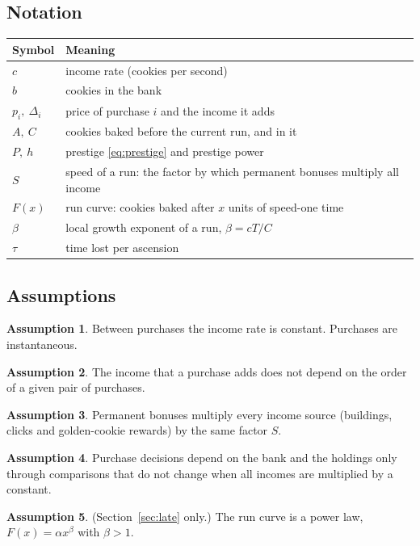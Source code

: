 \documentclass[11pt,a4paper]{article}
\numberwithin{equation}{section}
\theoremstyle{definition}
\newtheorem{assumption}{Assumption}
\theoremstyle{remark}
\begin{document}
\subsection{Notation}\label{sec:notation}
\begin{center}
\small
\begin{tabular}{@{}ll@{}}
\toprule
Symbol & Meaning \\
\midrule
$c$ & income rate (cookies per second) \\
$b$ & cookies in the bank \\
$p_i,\ \Delta_i$ & price of purchase $i$ and the income it adds \\
$A,\ C$ & cookies baked before the current run, and in it \\
$P,\ h$ & prestige \eqref{eq:prestige} and prestige power \\
$S$ & speed of a run: the factor by which permanent bonuses multiply all income \\
$F(x)$ & run curve: cookies baked after $x$ units of speed-one time \\
$\beta$ & local growth exponent of a run, $\beta=cT/C$ \\
$\tau$ & time lost per ascension \\
\bottomrule
\end{tabular}
\end{center}

\subsection{Assumptions}\label{sec:assumptions}
\begin{assumption}\label{as:piecewise}
Between purchases the income rate is constant. Purchases are instantaneous.
\end{assumption}
\begin{assumption}\label{as:additive}
The income that a purchase adds does not depend on the order of a given pair of purchases.
\end{assumption}
\begin{assumption}\label{as:speed}
Permanent bonuses multiply every income source (buildings, clicks and golden-cookie rewards) by the same factor $S$.
\end{assumption}
\begin{assumption}\label{as:scalefree}
Purchase decisions depend on the bank and the holdings only through comparisons that do not change when all incomes are multiplied by a constant.
\end{assumption}
\begin{assumption}\label{as:power}
(Section~\ref{sec:late} only.) The run curve is a power law, $F(x)=\alpha x^\beta$ with $\beta>1$.
\end{assumption}
\end{document}
